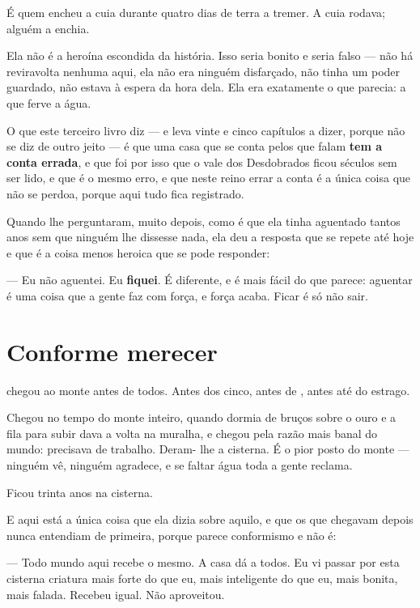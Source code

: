 \documentclass[livro.tex]{subfiles}
\begin{document}
É quem encheu a cuia durante quatro dias de terra a tremer. A cuia rodava; alguém a enchia.

\medskip

Ela não é a heroína escondida da história. Isso seria bonito e seria falso --- não há reviravolta
nenhuma aqui, ela não era ninguém disfarçado, não tinha um poder guardado, não estava à espera da
hora dela. Ela era exatamente o que parecia: a que ferve a água.

O que este terceiro livro diz --- e leva vinte e cinco capítulos a dizer, porque não se diz de
outro jeito --- é que uma casa que se conta pelos que falam \textbf{tem a conta errada}, e que
foi por isso que o vale dos Desdobrados ficou séculos sem ser lido, e que é o mesmo erro, e que
neste reino errar a conta é a única coisa que não se perdoa, porque aqui tudo fica registrado.

\medskip

Quando lhe perguntaram, muito depois, como é que ela tinha aguentado tantos anos sem que ninguém
lhe dissesse nada, ela deu a resposta que se repete até hoje e que é a coisa menos heroica que se
pode responder:

--- Eu não aguentei. Eu \textbf{fiquei}. É diferente, e é mais fácil do que parece: aguentar é
uma coisa que a gente faz com força, e força acaba. Ficar é só não sair.

\section{Conforme merecer}

\Lua chegou ao monte antes de todos. Antes dos cinco, antes de \Qui , antes até do estrago.

Chegou no tempo do monte inteiro, quando \Ven dormia de bruços sobre o ouro e a fila para subir
dava a volta na muralha, e chegou pela razão mais banal do mundo: precisava de trabalho. Deram-
lhe a cisterna. É o pior posto do monte --- ninguém vê, ninguém agradece, e se faltar água toda
a gente reclama.

Ficou trinta anos na cisterna.

\medskip

E aqui está a única coisa que ela dizia sobre aquilo, e que os que chegavam depois nunca
entendiam de primeira, porque parece conformismo e não é:

--- Todo mundo aqui recebe o mesmo. A casa dá a todos. Eu vi passar por esta cisterna criatura
mais forte do que eu, mais inteligente do que eu, mais bonita, mais falada. Recebeu igual. Não
aproveitou.
\end{document}
